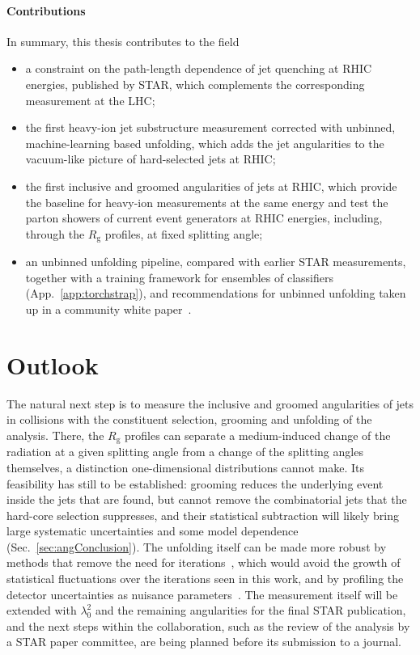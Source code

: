 \paragraph{Contributions}
In summary, this thesis contributes to the field
\begin{itemize}
	\item a constraint on the path-length dependence of jet quenching at RHIC energies, published by STAR, which complements the corresponding measurement at the LHC;
	\item the first heavy-ion jet substructure measurement corrected with unbinned, machine-learning based unfolding, which adds the jet angularities to the vacuum-like picture of hard-selected jets at RHIC;
	\item the first inclusive and groomed angularities of jets at RHIC, which provide the \pp baseline for heavy-ion measurements at the same energy and test the parton showers of current event generators at RHIC energies, including, through the \(R_\mathrm{g}\) profiles, at fixed splitting angle;
	\item an unbinned unfolding pipeline, compared with earlier STAR measurements, together with a training framework for ensembles of classifiers (App.~\ref{app:torchstrap}), and recommendations for unbinned unfolding taken up in a community white paper~\cite{Canelli_2026}.
\end{itemize}

\section{Outlook}
The natural next step is to measure the inclusive and groomed angularities of jets in \AuAu collisions with the constituent selection, grooming and unfolding of the \pp analysis.
%
There, the \(R_\mathrm{g}\) profiles can separate a medium-induced change of the radiation at a given splitting angle from a change of the splitting angles themselves, a distinction one-dimensional distributions cannot make.
%
Its feasibility has still to be established: grooming reduces the underlying event inside the jets that are found, but cannot remove the combinatorial jets that the hard-core selection suppresses, and their statistical subtraction will likely bring large systematic uncertainties and some model dependence (Sec.~\ref{sec:angConclusion}).
%
The unfolding itself can be made more robust by methods that remove the need for iterations~\cite{Ore:2026qgp}, which would avoid the growth of statistical fluctuations over the iterations seen in this work, and by profiling the detector uncertainties as nuisance parameters~\cite{Zhu:2024drd}.
%
The \pp measurement itself will be extended with \(\lambda_0^2\) and the remaining angularities for the final STAR publication, and the next steps within the collaboration, such as the review of the analysis by a STAR paper committee, are being planned before its submission to a journal.

